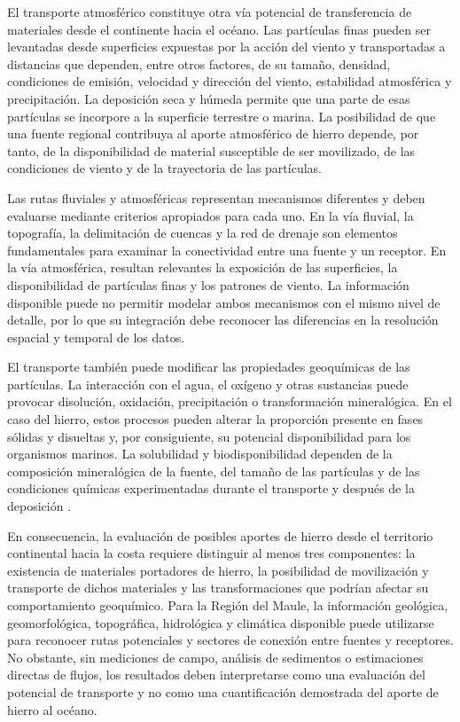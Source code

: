 El transporte atmosférico constituye otra vía potencial de transferencia de materiales desde el continente hacia el océano. Las partículas finas pueden ser levantadas desde superficies expuestas por la acción del viento y transportadas a distancias que dependen, entre otros factores, de su tamaño, densidad, condiciones de emisión, velocidad y dirección del viento, estabilidad atmosférica y precipitación. La deposición seca y húmeda permite que una parte de esas partículas se incorpore a la superficie terrestre o marina. La posibilidad de que una fuente regional contribuya al aporte atmosférico de hierro depende, por tanto, de la disponibilidad de material susceptible de ser movilizado, de las condiciones de viento y de la trayectoria de las partículas.

Las rutas fluviales y atmosféricas representan mecanismos diferentes y deben evaluarse mediante criterios apropiados para cada uno. En la vía fluvial, la topografía, la delimitación de cuencas y la red de drenaje son elementos fundamentales para examinar la conectividad entre una fuente y un receptor. En la vía atmosférica, resultan relevantes la exposición de las superficies, la disponibilidad de partículas finas y los patrones de viento. La información disponible puede no permitir modelar ambos mecanismos con el mismo nivel de detalle, por lo que su integración debe reconocer las diferencias en la resolución espacial y temporal de los datos.

El transporte también puede modificar las propiedades geoquímicas de las partículas. La interacción con el agua, el oxígeno y otras sustancias puede provocar disolución, oxidación, precipitación o transformación mineralógica. En el caso del hierro, estos procesos pueden alterar la proporción presente en fases sólidas y disueltas y, por consiguiente, su potencial disponibilidad para los organismos marinos. La solubilidad y biodisponibilidad dependen de la composición mineralógica de la fuente, del tamaño de las partículas y de las condiciones químicas experimentadas durante el transporte y después de la deposición \citep{Tagliabue2017,Zan2025}.

En consecuencia, la evaluación de posibles aportes de hierro desde el territorio continental hacia la costa requiere distinguir al menos tres componentes: la existencia de materiales portadores de hierro, la posibilidad de movilización y transporte de dichos materiales y las transformaciones que podrían afectar su comportamiento geoquímico. Para la Región del Maule, la información geológica, geomorfológica, topográfica, hidrológica y climática disponible puede utilizarse para reconocer rutas potenciales y sectores de conexión entre fuentes y receptores. No obstante, sin mediciones de campo, análisis de sedimentos o estimaciones directas de flujos, los resultados deben interpretarse como una evaluación del potencial de transporte y no como una cuantificación demostrada del aporte de hierro al océano.


